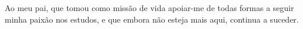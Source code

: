 Ao meu pai, que tomou como missão de vida apoiar-me de todas formas a seguir minha paixão nos estudos, e que embora não esteja mais aqui, continua a suceder.